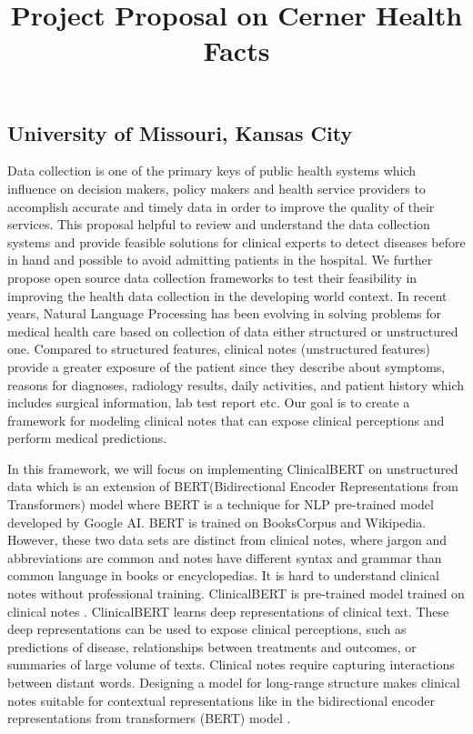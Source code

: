 \documentclass[letterpaper,12pt]{article}
\title{Project Proposal on Cerner Health Facts \vspace{-2em}}
\date{\vspace{-5ex}}
\theoremstyle{plain}
\begin{document}
\maketitle
\begin{center}
\section*{University of Missouri, Kansas City}

\justifying Data collection is one of the primary keys of public health systems which influence  on decision makers, policy makers and health service providers to accomplish accurate and timely data in order to improve the quality of their services. This proposal helpful to review and understand the data collection systems and provide feasible solutions for clinical experts to detect diseases before in hand and possible to avoid admitting patients in the hospital. We further propose  open source data collection frameworks to test their feasibility in improving the health data collection in the developing world context. In recent years, Natural Language Processing has been evolving in solving problems for medical health care based on collection of data either structured or unstructured one. Compared to structured features, clinical notes (unstructured features) provide a greater exposure of the patient since they describe about symptoms, reasons for diagnoses, radiology results, daily activities, and patient history which includes surgical information, lab test report etc. Our goal is to create a framework for modeling clinical notes that can expose clinical perceptions and perform medical predictions.

 \hspace{1cm} In this framework, we will focus on implementing ClinicalBERT on unstructured data which is an extension of BERT(Bidirectional Encoder Representations from Transformers) model where BERT \cite{DBLP:journals/corr/abs-1810-04805} is a technique for NLP pre-trained model developed by Google AI. BERT is trained on BooksCorpus and Wikipedia. However, these two data sets are distinct from clinical notes, where jargon and abbreviations are common and notes have different syntax and grammar than common language in books or encyclopedias.  It is hard to understand clinical notes without professional training. ClinicalBERT is pre-trained model trained on clinical notes \cite{DBLP:journals/corr/abs-1904-05342}. ClinicalBERT learns deep representations of clinical text. These deep representations can be used to expose clinical perceptions, such as predictions of disease, relationships between treatments and outcomes, or summaries of large volume of texts. Clinical notes require capturing interactions between distant words. Designing a model for long-range structure makes clinical notes suitable for contextual representations like in the bidirectional encoder representations from transformers (BERT) model \cite{DBLP:journals/corr/abs-1810-04805}.
\end{center}




\end{document}
